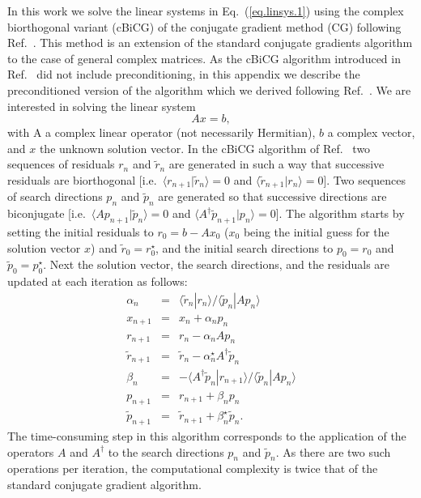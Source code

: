 \documentclass[twocolumn,prb,showpacs,superscriptaddress]{revtex4}
\def\>{\rangle}
\def\<{\langle}
\def\rt{\tilde{r}}
\def\pt{\tilde{p}}
\begin{document}
In this work we solve the linear systems in Eq.\ (\ref{eq.linsys.1}) 
using the complex biorthogonal variant (cBiCG) of the conjugate gradient method (CG)
following Ref.\ . This method is an extension of the standard
conjugate gradients algorithm to the
case of general complex matrices.
As the cBiCG algorithm introduced in Ref.\  
did not include preconditioning, in this appendix we describe 
the preconditioned version of the algorithm which we derived 
following Ref.~.
We are interested in solving the linear system
  \begin{equation}\label{eq.axeqb}
  Ax=b,
  \end{equation}
with A a complex linear operator (not necessarily Hermitian), $b$ a complex 
vector, and $x$ the unknown solution vector.
In the cBiCG algorithm of Ref.\  two sequences of residuals $r_n$ and
$\rt_n$ are generated in such a way that successive residuals 
are biorthogonal [i.e.\ $\<r_{n+1}|\rt_n\>=0$ and $\<\rt_{n+1}|r_n\>=0$].
Two sequences of search directions 
$p_n$ and $\pt_n$ are generated so that successive directions
are biconjugate [i.e.\ $\< A p_{n+1}|\pt_n \> =0$ and 
$\< A^\dagger \pt_{n+1}|p_n \> =0$].
The algorithm starts by setting the initial residuals to
$r_0 = b-Ax_0$ ($x_0$ being the initial guess for the solution vector $x$) 
and $\rt_0=r_0^\star$, and the initial search directions to $p_0=r_0$ 
and $\pt_0=p_0^\star$. Next the solution
vector, the search directions, and the residuals are updated at each
iteration as follows:
  \begin{eqnarray}
  \alpha_n & = & \<\rt_n|r_n\>/\<\pt_n|Ap_n\> \label{eq.cg1}  \\ 
  x_{n+1} & = & x_n + \alpha_n p_n \label{eq.cg2} \\ 
  r_{n+1} & = & r_n - \alpha_n Ap_n \label{eq.cg3} \\ 
  \rt_{n+1} & = & \rt_n - \alpha_n^\star A^\dagger \pt_n \label{eq.cg4}\\ 
  \beta_n & = & - \<A^\dagger\pt_n|r_{n+1}\>/\<\pt_n|Ap_n\> \label{eq.cg5}\\ 
  p_{n+1} & = & r_{n+1} + \beta_n p_n \label{eq.cg6}\\ 
  \pt_{n+1} & = & \rt_{n+1} + \beta_n^\star \label{eq.cg7} \pt_n. 
  \end{eqnarray}
The time-consuming step in this algorithm corresponds to the application of the operators
$A$ and $A^\dagger$ to the search directions $p_n$ and $\pt_n$. 
As there are two such operations per iteration, the computational complexity 
is twice that of the standard conjugate gradient algorithm.
\end{document}
